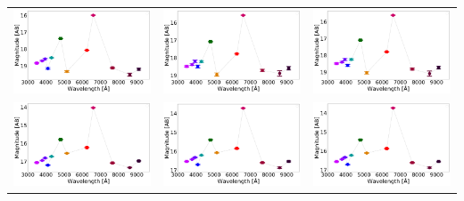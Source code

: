 \begin{table}[!h]
\begin{tabular}{ccc}

\includegraphics[width=0.3\linewidth, clip]{photopectrum_splus_MC0114-273678_aper.pdf} & \includegraphics[width=0.3\linewidth, clip]{photopectrum_splus_MC0114-273678_auto.pdf} & \includegraphics[width=0.3\linewidth, clip]{photopectrum_splus_MC0114-273678_petro.pdf} \\
\includegraphics[width=0.3\linewidth, clip]{photopectrum_splus_MC0115-043944_aper.pdf} & \includegraphics[width=0.3\linewidth, clip]{photopectrum_splus_MC0115-043944_auto.pdf} & \includegraphics[width=0.3\linewidth, clip]{photopectrum_splus_MC0115-043944_petro.pdf} \\

\end{tabular}
\end{table}
